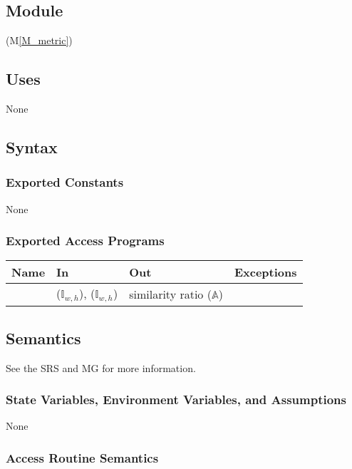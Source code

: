 \documentclass[12pt, titlepage]{article}
\newcommand{\mref}[1]{M\ref{#1}}
\newcommand{\mrefp}[1]{(\mref{#1})}
\begin{document}
\subsection{Module}
 \mrefp{M_metric}

\subsection{Uses}
None

\subsection{Syntax}

\subsubsection{Exported Constants}
None

\subsubsection{Exported Access Programs}

\begin{center}
\begin{tabular}{L{2cm} L{4cm} L{4cm} L{5cm}}
\hline
\textbf{Name} & \textbf{In} & \textbf{Out} & \textbf{Exceptions} \\
\hline
{} &  ($\mathbb{I}_{w,h}$),  ($\mathbb{I}_{w,h}$)
  & similarity ratio ($\mathbb{A}$) &  \\
\hline
\end{tabular}
\end{center}

\subsection{Semantics}
See the SRS \cite{SRS} and MG \cite{MG} for more information.

\subsubsection{State Variables, Environment Variables, and Assumptions}
None

\subsubsection{Access Routine Semantics}
\end{document}
